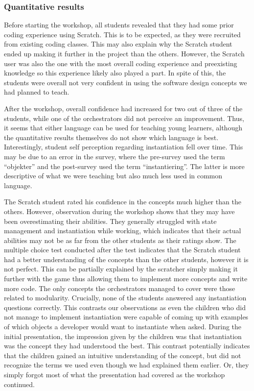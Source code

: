 \subsubsection{Quantitative results}
Before starting the workshop, all students revealed that they had some prior coding experience using Scratch.
This is to be expected, as they were recruited from existing coding classes.
This may also explain why the Scratch student ended up making it further in the project than the others.
However, the Scratch user was also the one with the most overall coding experience and preexisting knowledge so this experience likely also played a part.
In spite of this, the students were overall not very confident in using the software design concepts we had planned to teach.

After the workshop, overall confidence had increased for two out of three of the students, while one of the orchestrators did not perceive an improvement.
Thus, it seems that either language can be used for teaching young learners, although the quantitative results themselves do not show which language is best.
Interestingly, student self perception regarding instantiation fell over time.
This may be due to an error in the survey, where the pre-survey used the term ``objekter'' and the post-survey used the term ``instantiering''.
The latter is more descriptive of what we were teaching but also much less used in common language.

The Scratch student rated his confidence in the concepts much higher than the others.
However, observation during the workshop shows that they may have been overestimating their abilities.
They generally struggled with state management and instantiation while working, which indicates that their actual abilities may not be as far from the other students as their ratings show.
The multiple choice test conducted after the test indicates that the Scratch student had a better understanding of the concepts than the other students, however it is not perfect.
This can be partially explained by the scratcher simply making it further with the game thus allowing them to implement more concepts and write more code.
The only concepts the orchestrators managed to cover were those related to modularity.
Crucially, none of the students answered any instantiation questions correctly.
This contrasts our observations as even the children who did not manage to implement instantiation were capable of coming up with examples of which objects a developer would want to instantiate when asked.
During the initial presentation, the impression given by the children was that instantiation was the concept they had understood the best.
This contrast potentially indicates that the children gained an intuitive understanding of the concept, but did not recognize the terms we used even though we had explained them earlier.
Or, they simply forgot most of what the presentation had covered as the workshop continued.

